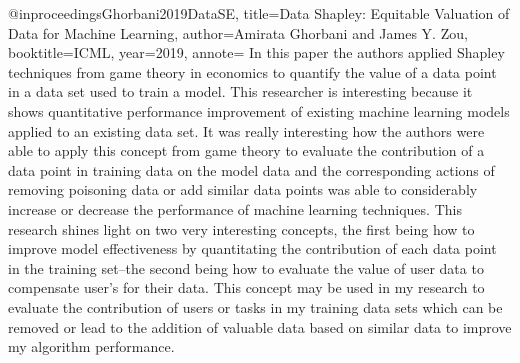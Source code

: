 @inproceedings{Ghorbani2019DataSE,
  title={Data Shapley: Equitable Valuation of Data for Machine Learning},
  author={Amirata Ghorbani and James Y. Zou},
  booktitle={ICML},
  year={2019},
  annote={
    In this paper the authors applied Shapley techniques from game theory in economics to quantify the value of a data point in a data set used to train a model. This researcher
    is interesting because it shows quantitative performance improvement of existing machine learning models applied to an existing data set. It was really interesting how the authors
    were able to apply this concept from game theory to evaluate the contribution of a data point in training data on the model data and the corresponding actions of removing poisoning data
    or add similar data points was able to considerably increase or decrease the performance of machine learning techniques. This research shines light on two very interesting concepts, the first
    being how to improve model effectiveness by quantitating the contribution of each data point in the training set--the second being how to evaluate the value of user data to compensate user's for
    their data. This concept may be used in my research to evaluate the contribution of users or tasks in my training data sets which can be removed or lead to the addition of valuable data based on
    similar data to improve my algorithm performance.
  }
}

